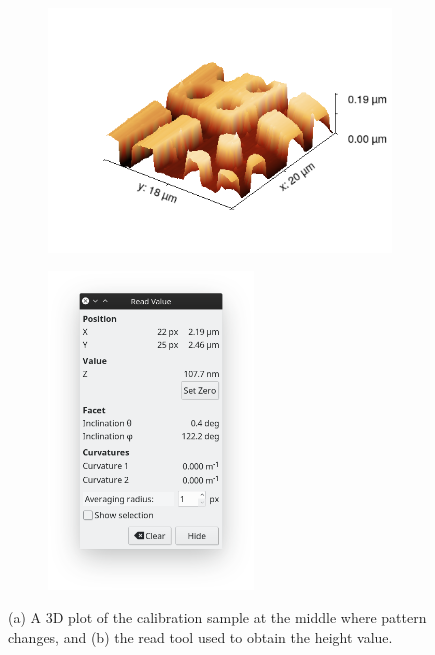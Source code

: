 \documentclass[11pt,a4paper]{article}
\begin{document}
\begin{figure}[H]
\centering
\begin{subfigure}[b]{0.45\textwidth}
\includegraphics[scale=0.47]{sm_border_3D}
\caption{}
\label{fig: cal sam border}
\end{subfigure}
\begin{subfigure}[b]{0.45\textwidth}
\centering
\includegraphics[width=0.6\textwidth]{static_mode_read_value_height}
\caption{}
\label{fig:read_tool}
\end{subfigure}
\caption{(a) A 3D plot of the calibration sample at the middle where pattern changes, and (b) the read tool used to obtain the height value.}
\label{fig:3d_and_read_value}
\end{figure}
\end{document}
